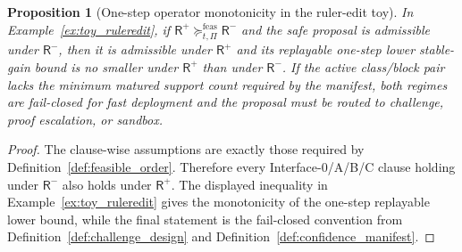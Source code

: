 \documentclass[11pt]{article}
\newtheorem{proposition}[theorem]{Proposition}
\theoremstyle{definition}
\newcommand{\1}{\mathbf{1}}
\begin{document}
\begin{proposition}[One-step operator monotonicity in the ruler-edit toy]\label{prop:toy_ruleredit_mono}
In Example~\ref{ex:toy_ruleredit}, if $\mathsf R^+ \succeq^{\mathrm{feas}}_{t,\Pi} \mathsf R^-$ and the safe proposal is admissible under $\mathsf R^-$, then it is admissible under $\mathsf R^+$ and its replayable one-step lower stable-gain bound is no smaller under $\mathsf R^+$ than under $\mathsf R^-$. If the active class/block pair lacks the minimum matured support count required by the manifest, both regimes are fail-closed for fast deployment and the proposal must be routed to challenge, proof escalation, or sandbox.
\end{proposition}

\begin{proof}
The clause-wise assumptions are exactly those required by Definition~\ref{def:feasible_order}. Therefore every Interface-0/A/B/C clause holding under $\mathsf R^-$ also holds under $\mathsf R^+$. The displayed inequality in Example~\ref{ex:toy_ruleredit} gives the monotonicity of the one-step replayable lower bound, while the final statement is the fail-closed convention from Definition~\ref{def:challenge_design} and Definition~\ref{def:confidence_manifest}.
\end{proof}
\end{document}
